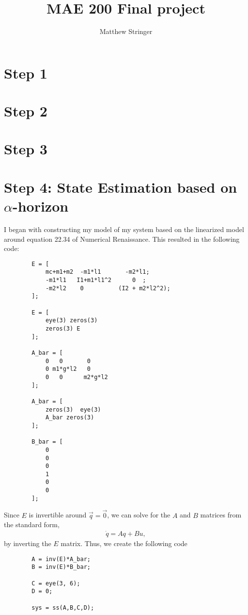 \documentclass{article}
\title{MAE 200 Final project}
\author{Matthew Stringer}
\date{}
\theoremstyle{definition}
\begin{document}
    \maketitle
    \section*{Step 1}
    
    \section*{Step 2}
    
    \section*{Step 3}

    \section*{Step 4: State Estimation based on $\alpha$-horizon}
    I began with constructing my model of my system based on the linearized
    model around equation 22.34 of Numerical Renaissance. 
    This resulted in the following code:
    \begin{verbatim}
        E = [
            mc+m1+m2  -m1*l1       -m2*l1;
            -m1*l1   I1+m1*l1^2      0  ;
            -m2*l2    0          (I2 + m2*l2^2);
        ];

        E = [
            eye(3) zeros(3)
            zeros(3) E
        ];

        A_bar = [
            0   0       0
            0 m1*g*l2   0
            0   0      m2*g*l2
        ];

        A_bar = [ 
            zeros(3)  eye(3) 
            A_bar zeros(3)
        ];

        B_bar = [
            0
            0
            0
            1
            0
            0
        ];
    \end{verbatim}
    Since $E$ is invertible around $\vec q = \vec 0$, we can solve for 
    the $A$ and $B$ matrices from the standard form,
    \begin{eqnarray*}
        \dot q = A q + B u,
    \end{eqnarray*}
    by inverting the $E$ matrix. 
    Thus, we create the following code
    \begin{verbatim}
        A = inv(E)*A_bar;
        B = inv(E)*B_bar;

        C = eye(3, 6);
        D = 0;

        sys = ss(A,B,C,D);
    \end{verbatim}
\end{document}
